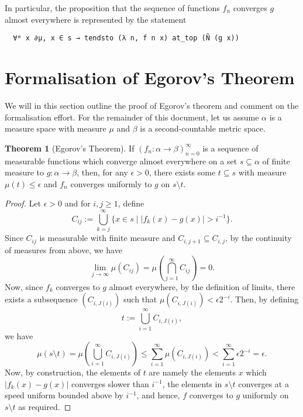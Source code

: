 \documentclass[]{article}
\theoremstyle{definition}
\newtheorem{theorem}{Theorem}
\begin{document}
In particular, the proposition that the sequence of functions \(f_n\) converges 
\(g\) almost everywhere is represented by the statement 
\begin{verbatim}
  ∀ᵐ x ∂μ, x ∈ s → tendsto (λ n, f n x) at_top (Ñ (g x))
\end{verbatim}

\section*{Formalisation of Egorov's Theorem}

We will in this section outline the proof of Egorov's theorem and comment on the formalisation effort.
For the remainder of this document, let us assume \(\alpha\) is a measure space with measure \(\mu\) 
and \(\beta\) is a second-countable metric space.

\begin{theorem}[Egorov's Theorem]
  If \((f_n : \alpha \to \beta)_{n = 0}^\infty\) is a sequence of measurable functions which 
  converge almost everywhere on a set \(s \subseteq \alpha\) of finite measure to 
  \(g : \alpha \to \beta\), then, for any \(\epsilon > 0\), there exists some \(t \subseteq s\) 
  with measure \(\mu(t) \le \epsilon\) and \(f_n\) converges uniformly to \(g\) on 
  \(s \setminus t\). 
\end{theorem}
\begin{proof}
  Let \(\epsilon > 0\) and for \(i, j \ge 1\), define 
  \[C_{ij} := \bigcup_{k = j}^\infty \{x \in s \mid |f_k(x) - g(x)| > i^{-1}\}.\]
  Since \(C_{ij}\) is measurable with finite measure and \(C_{i, j + 1} \subseteq C_{i, j}\), by the 
  continuity of measures from above, we have 
  \[\lim_{j \to \infty} \mu(C_{ij}) = 
    \mu\left(\bigcap_{j = 1}^\infty C_{ij}\right) = 0.\]
  Now, since \(f_k\) converges to \(g\) almost everywhere, by the definition of 
  limits, there exists a subsequence \((C_{i, J(i)})\) such that \(\mu(C_{i, J(i)}) < 
  \epsilon 2^{-i}\). Then, by defining 
  \[t := \bigcup_{i = 1}^\infty C_{i, J(i)},\]
  we have 
  \[\mu(s \setminus t) = \mu\left(\bigcup_{i = 1}^\infty C_{i, J(i)}\right) \le \sum_{i = 1}^\infty \mu(C_{i, J(i)})
    < \sum_{i = 1}^\infty \epsilon 2^{-i} = \epsilon.\]
  Now, by construction, the elements of \(t\) are namely the elements \(x\) 
  which \(|f_k(x) - g(x)|\) converges slower than \(i^{-1}\), the elements in 
  \(s \setminus t\) converges at a speed uniform bounded above by \(i^{-1}\), and 
  hence, \(f\) converges to \(g\) uniformly on \(s \setminus t\) as required.
\end{proof}
\end{document}
